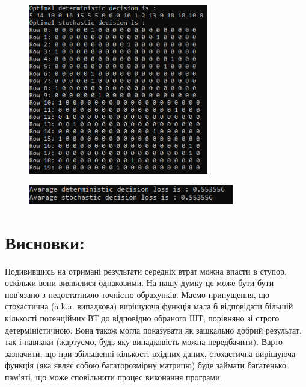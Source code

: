 \begin{figure}[!ht]
    \centering
    \begin{minipage}{0.7\linewidth}
        \includegraphics[width=0.7\textwidth, scale=0.2]{ReportPic/report_4.png}
    \end{minipage}
\end{figure}
\begin{figure}[!ht]
        \centering
        \begin{minipage}{0.85\linewidth}
            \includegraphics[width=0.8\textwidth, scale=1.0]{ReportPic/report_5.png}
        \end{minipage}
\end{figure}

\section{Висновки:}
Подивившись на отримані результати середніх втрат можна впасти в ступор, оскільки вони виявилися однаковими. На нашу думку це 
може бути бути пов'язано з недостатньою точністю обрахунків. Маємо припущення, що стохастична (a.k.a. випадкова) вирішуюча 
функція мала б відповідати більшій кількості потенційних ВТ до відповідно обраного ШТ, порівняно зі строго детерміністичною. 
Вона також могла показувати як зашкально добрий результат, так і навпаки (жартуємо, будь-яку випадковість можна передбачити). 
Варто зазначити, що при збільшенні кількості вхідних даних, стохастична вирішуюча функція (яка являє собою багаторозмірну 
матрицю) буде займати багатенько пам'яті, що може сповільнити процес виконання програми.

